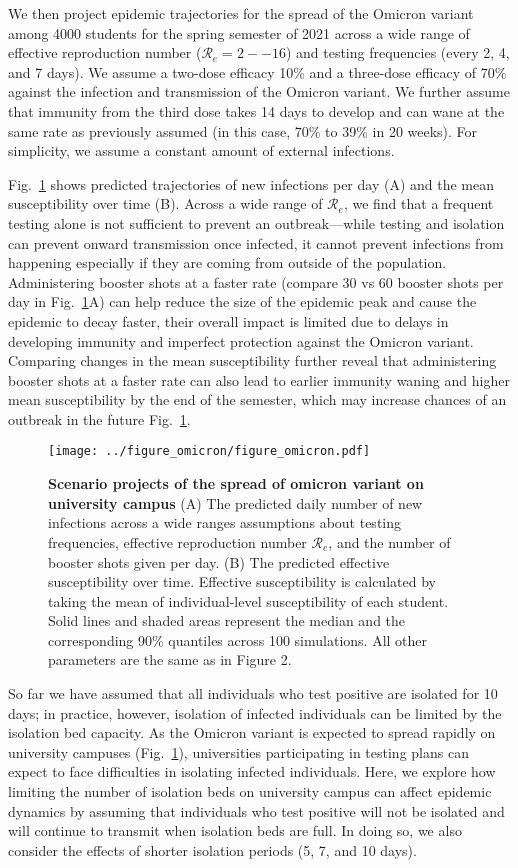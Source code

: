 \documentclass[12pt]{article}
\newcommand{\fref}[1]{Fig.~\ref{fig:#1}}
\begin{document}
We then project epidemic trajectories for the spread of the Omicron variant among 4000 students for the spring semester of 2021 across a wide range of effective reproduction number ($\mathcal R_e = 2--16$) and testing frequencies (every 2, 4, and 7 days).
We assume a two-dose efficacy 10\% and a three-dose efficacy of 70\% against the infection and transmission of the Omicron variant. 
We further assume that immunity from the third dose takes 14 days to develop and can wane at the same rate as previously assumed (in this case, 70\% to 39\% in 20 weeks).
For simplicity, we assume a constant amount of external infections.

\fref{omicron} shows predicted trajectories of new infections per day (A) and the mean susceptibility over time (B).
Across a wide range of $\mathcal R_e$, we find that a frequent testing alone is not sufficient to prevent an outbreak---while testing and isolation can prevent onward transmission once infected, it cannot prevent infections from happening especially if they are coming from outside of the population.
Administering booster shots at a faster rate (compare 30 vs 60 booster shots per day in \fref{omicron}A) can help reduce the size of the epidemic peak and cause the epidemic to decay faster, their overall impact is limited due to delays in developing immunity and imperfect protection against the Omicron variant.
Comparing changes in the mean susceptibility further reveal that administering booster shots at a faster rate can also lead to earlier immunity waning and higher mean susceptibility by the end of the semester, which may increase chances of an outbreak in the future \fref{omicron}.

\begin{figure}[!th]
\texttt{[image: ../figure\_omicron/figure\_omicron.pdf]}
\caption{
\textbf{Scenario projects of the spread of omicron variant on university campus}
(A) The predicted daily number of new infections across a wide ranges assumptions about testing frequencies, effective reproduction number $\mathcal R_e$, and the number of booster shots given per day.
(B) The predicted effective susceptibility over time. 
Effective susceptibility is calculated by taking the mean of individual-level susceptibility of each student.
Solid lines and shaded areas represent the median and the corresponding 90\% quantiles across 100 simulations.
All other parameters are the same as in Figure 2.
\label{fig:omicron}
}
\end{figure}

So far we have assumed that all individuals who test positive are isolated for 10 days;
in practice, however, isolation of infected individuals can be limited by the isolation bed capacity.
As the Omicron variant is expected to spread rapidly on university campuses (\fref{omicron}), universities participating in testing plans can expect to face difficulties in isolating infected individuals.
Here, we explore how limiting the number of isolation beds on university campus can affect epidemic dynamics by assuming that individuals who test positive will not be isolated and will continue to transmit when isolation beds are full.
In doing so, we also consider the effects of shorter isolation periods (5, 7, and 10 days).
\end{document}
